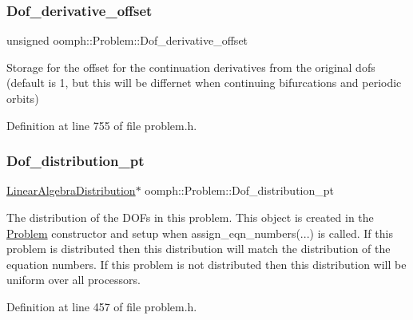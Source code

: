 \mbox{\label{classoomph_1_1Problem_af0372f742b90bb402c6edc720ceeb421}} 
\subsubsection{\texorpdfstring{Dof\+\_\+derivative\+\_\+offset}{Dof\_derivative\_offset}}
{\footnotesize\ttfamily unsigned oomph\+::\+Problem\+::\+Dof\+\_\+derivative\+\_\+offset\hspace{0.3cm}{\ttfamily [protected]}}

Storage for the offset for the continuation derivatives from the original dofs (default is 1, but this will be differnet when continuing bifurcations and periodic orbits) 

Definition at line 755 of file problem.\+h.

\mbox{\label{classoomph_1_1Problem_ade01b88db08dcec1706fe44eaa0090a3}} 
\subsubsection{\texorpdfstring{Dof\+\_\+distribution\+\_\+pt}{Dof\_distribution\_pt}}
{\footnotesize\ttfamily \hyperlink{classoomph_1_1LinearAlgebraDistribution}{Linear\+Algebra\+Distribution}$\ast$ oomph\+::\+Problem\+::\+Dof\+\_\+distribution\+\_\+pt\hspace{0.3cm}{\ttfamily [protected]}}



The distribution of the D\+O\+Fs in this problem. This object is created in the \hyperlink{classoomph_1_1Problem}{Problem} constructor and setup when assign\+\_\+eqn\+\_\+numbers(...) is called. If this problem is distributed then this distribution will match the distribution of the equation numbers. If this problem is not distributed then this distribution will be uniform over all processors. 



Definition at line 457 of file problem.\+h.




